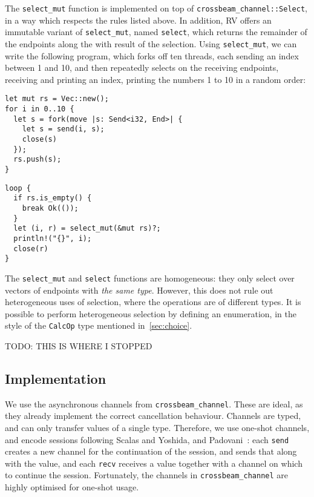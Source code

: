 \documentclass[copyright,creativecommons]{eptcs}
\begin{document}
The \lstinline{select_mut} function is implemented on top of \lstinline{crossbeam_channel::Select}, in a way which respects the rules listed above. In addition, RV offers an immutable variant of \lstinline{select_mut}, named \lstinline{select}, which returns the remainder of the endpoints along the with result of the selection. Using \lstinline{select_mut}, we can write the following program, which forks off ten threads, each sending an index between 1 and 10, and then repeatedly selects on the receiving endpoints, receiving and printing an index, printing the numbers 1 to 10 in a random order:

\vspace{-0.5\baselineskip}
\begin{minipage}[t]{0.5\linewidth}
\begin{lstlisting}
let mut rs = Vec::new();
for i in 0..10 {
  let s = fork(move |s: Send<i32, End>| {
    let s = send(i, s);
    close(s)
  });
  rs.push(s);
}
\end{lstlisting}
\end{minipage}
\begin{minipage}[t]{0.5\linewidth}
\begin{lstlisting}
loop {
  if rs.is_empty() {
    break Ok(());
  }
  let (i, r) = select_mut(&mut rs)?;
  println!("{}", i);
  close(r)
}
\end{lstlisting}
\end{minipage}

The \lstinline{select_mut} and \lstinline{select} functions are homogeneous: they only select over vectors of endpoints with \emph{the same type}. However, this does not rule out heterogeneous uses of selection, where the operations are of different types. It is possible to perform heterogeneous selection by defining an enumeration, in the style of the \lstinline{CalcOp} type mentioned in~\cref{sec:choice}.

TODO: THIS IS WHERE I STOPPED

\subsection{Implementation}\label{sec:implementation}
We use the asynchronous channels from \lstinline{crossbeam_channel}. These are ideal, as they already implement the correct cancellation behaviour. Channels are typed, and can only transfer values of a single type. Therefore, we use one-shot channels, and encode sessions following Scalas and Yoshida, and Padovani~\cite{scalas2016,padovani2017}: each \lstinline{send} creates a new channel for the continuation of the session, and sends that along with the value, and each \lstinline{recv} receives a value together with a channel on which to continue the session. Fortunately, the channels in \lstinline{crossbeam_channel} are highly optimised for one-shot usage.
\end{document}
